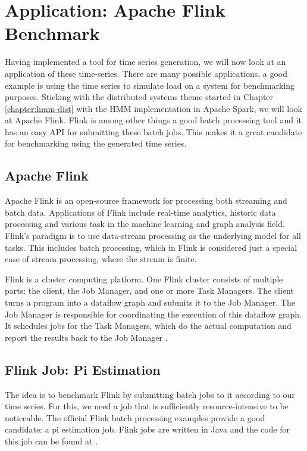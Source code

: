 \chapter{Application: Apache Flink Benchmark}\label{chapter:benchmark}

Having implemented a tool for time series generation, we will now look at an application of these time-series. There are many possible applications, a good example is using the time series to simulate load on a system for benchmarking purposes. Sticking with the distributed systems theme started in Chapter \ref{chapter:hmm-dist} with the HMM implementation in Apache Spark, we will look at Apache Flink. Flink is among other things a good batch processing tool and it has an easy API for submitting these batch jobs. This makes it a great candidate for benchmarking using the generated time series. 

\section{Apache Flink}

Apache Flink is an open-source framework for processing both streaming and batch data. Applications of Flink include real-time analytics, historic data processing and various task in the machine learning and graph analysis field. Flink's paradigm is to use data-stream processing as the underlying model for all tasks. This includes batch processing, which in Flink is considered just a special case of stream processing, where the stream is finite. 

Flink is a cluster computing platform. One Flink cluster consists of multiple parts: the client, the Job Manager, and one or more Task Managers. The client turns a program into a dataflow graph and submits it to the Job Manager. The Job Manager is responsible for coordinating the execution of this dataflow graph. It schedules jobs for the Task Managers, which do the actual computation and report the results back to the Job Manager \parencite{carbone2015apache}.

\section{Flink Job: Pi Estimation}

The idea is to benchmark Flink by submitting batch jobs to it according to our time series. For this, we need a job that is sufficiently resource-intensive to be noticeable. The official Flink batch processing examples provide a good candidate: a pi estimation job. Flink jobs are written in Java and the code for this job can be found at \parencite{flinkpiestim}. 

